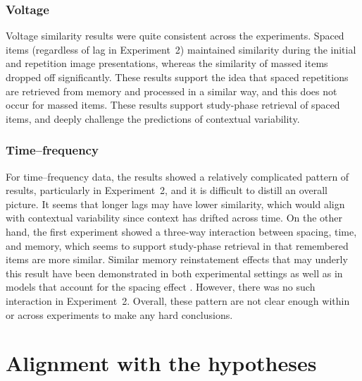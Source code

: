\subsubsection{Voltage}

Voltage similarity results were quite consistent across the experiments.  Spaced items (regardless of lag in Experiment~2) maintained similarity during the initial and repetition image presentations, whereas the similarity of massed items dropped off significantly.  These results support the idea that spaced repetitions are retrieved from memory and processed in a similar way, and this does not occur for massed items.  These results support study-phase retrieval of spaced items, and deeply challenge the predictions of contextual variability.

\subsubsection{Time--frequency}

For time--frequency data, the results showed a relatively complicated pattern of results, particularly in Experiment~2, and it is difficult to distill an overall picture.  It seems that longer lags may have lower similarity, which would align with contextual variability since context has drifted across time.
On the other hand, the first experiment showed a three-way interaction between spacing, time, and memory, which seems to support study-phase retrieval in that remembered items are more similar.  Similar memory reinstatement effects that may underly this result have been demonstrated in both experimental settings \cite{MannEtal2011} as well as in models that account for the spacing effect \cite{LohnKaha2014b}.  However, there was no such interaction in Experiment~2.  Overall, these pattern are not clear enough within or across experiments to make any hard conclusions.




\section{Alignment with the hypotheses}


